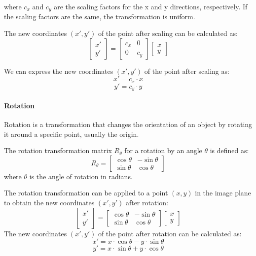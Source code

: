 where \( c_x \) and \( c_y \) are the scaling factors for the x and y directions, respectively. 
If the scaling factors are the same, the transformation is uniform.

The new coordinates \( (x', y') \) of the point after scaling can be calculated as:
\[\begin{bmatrix} x' \\ y' \end{bmatrix} = \begin{bmatrix} c_x & 0 \\ 0 & c_y \end{bmatrix} \begin{bmatrix} x \\ y \end{bmatrix} \]

We can express the new coordinates \( (x', y') \) of the point after scaling as:
\[ x' = c_x \cdot x \]
\[ y' = c_y \cdot y \]

\paragraph{Rotation}
Rotation is a transformation that changes the orientation of an object by rotating it around a specific point, usually the origin.

The rotation transformation matrix $R_{\theta}$ for a rotation by an angle \( \theta \) is defined as:
\[ R_{\theta} = \begin{bmatrix} \cos \theta & -\sin \theta \\ \sin \theta & \cos \theta \end{bmatrix} \]
where \( \theta \) is the angle of rotation in radians.

The rotation transformation can be applied to a point \( (x, y) \) in the image plane to obtain the new coordinates \( (x', y') \) after rotation:
\[\begin{bmatrix} x' \\ y' \end{bmatrix} = \begin{bmatrix} \cos \theta & -\sin \theta \\ \sin \theta & \cos \theta \end{bmatrix} \begin{bmatrix} x \\ y \end{bmatrix} \]
The new coordinates \( (x', y') \) of the point after rotation can be calculated as:
\[ x' = x \cdot \cos \theta - y \cdot \sin \theta \]
\[ y' = x \cdot \sin \theta + y \cdot \cos \theta \]

